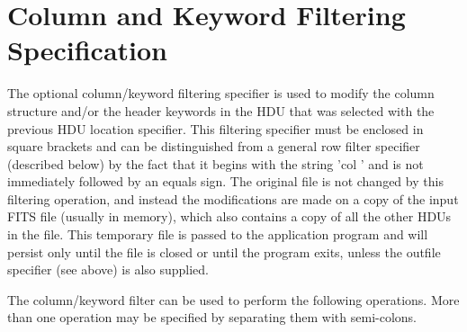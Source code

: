 \documentclass[11pt]{book}
\begin{document}
\section{Column and Keyword Filtering Specification}

The optional column/keyword filtering specifier is used to modify the
column structure and/or the header keywords in the HDU that was
selected with the previous HDU location specifier. This filtering
specifier must be enclosed in square brackets and can be distinguished
from a general row filter specifier (described below) by the fact that
it begins with the string 'col ' and is not immediately followed by an
equals sign.  The original file is not changed by this filtering
operation, and instead the modifications are made on a copy of the
input FITS file (usually in memory), which also contains a copy of all
the other HDUs in the file.  This temporary file is passed to the
application program and will persist only until the file is closed or
until the program exits, unless the outfile specifier (see above) is
also supplied.

The column/keyword filter can be used to perform the following
operations.  More than one operation may be specified by separating
them with semi-colons.
\end{document}
